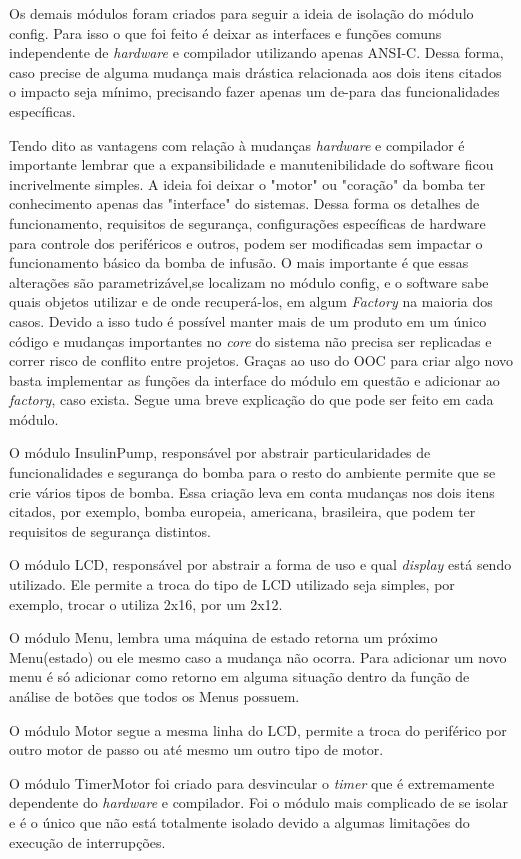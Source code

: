 Os demais módulos foram criados para seguir a ideia de isolação do módulo config. Para isso o que foi feito é deixar as interfaces e funções comuns independente de \emph{hardware} e compilador utilizando apenas ANSI-C. Dessa forma, caso precise de alguma mudança mais drástica relacionada aos dois itens citados o impacto seja mínimo, precisando fazer apenas um de-para das funcionalidades específicas. 

Tendo dito as vantagens com relação à mudanças \emph{hardware} e compilador é importante lembrar que a expansibilidade e manutenibilidade do software ficou incrivelmente simples. A ideia foi deixar o "motor" ou "coração" da bomba ter conhecimento apenas das "interface" do sistemas. Dessa forma os detalhes de funcionamento, requisitos de segurança, configurações específicas de hardware para controle dos periféricos e outros, podem ser modificadas sem impactar o funcionamento básico da bomba de infusão. O mais importante é que essas alterações são parametrizável,se localizam no módulo config, e o software sabe quais objetos utilizar e de onde recuperá-los, em algum \emph{Factory} na maioria dos casos. Devido a isso tudo é possível manter mais de um produto em um único código e mudanças importantes no \emph{core} do sistema não precisa ser replicadas e correr risco de conflito entre projetos. Graças ao uso do OOC para criar algo novo basta implementar as funções da interface do módulo em questão e adicionar ao \emph{factory}, caso exista. Segue uma breve explicação do que pode ser feito em cada módulo.

O módulo InsulinPump, responsável por abstrair particularidades de funcionalidades e segurança do bomba para o resto do ambiente permite que se crie vários tipos de bomba. Essa criação leva em conta mudanças nos dois itens citados, por exemplo, bomba europeia, americana, brasileira, que podem ter requisitos de segurança distintos.

O módulo LCD, responsável por abstrair a forma de uso e qual \emph{display} está sendo utilizado. Ele permite a troca do tipo de LCD utilizado seja simples, por exemplo, trocar o utiliza 2x16, por um 2x12.

O módulo Menu, lembra uma máquina de estado retorna um próximo Menu(estado) ou ele mesmo caso a mudança não ocorra. Para adicionar um novo menu é só adicionar como retorno em alguma situação dentro da função de análise de botões que todos os Menus possuem.

O módulo Motor segue a mesma linha do LCD, permite a troca do periférico por outro motor de passo ou até mesmo um outro tipo de motor.

O módulo TimerMotor foi criado para desvincular o \emph{timer} que é extremamente dependente do \emph{hardware} e compilador. Foi o módulo mais complicado de se isolar e é o único que não está totalmente isolado devido a algumas limitações do execução de interrupções.